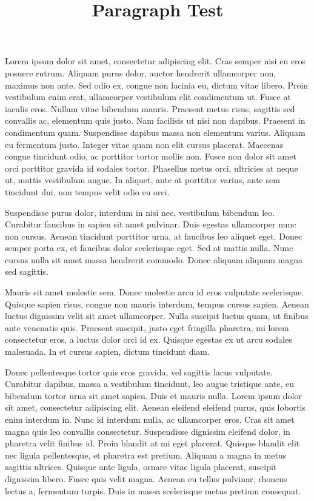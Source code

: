 \documentclass{article}
\title{Paragraph Test}
\begin{document}
Lorem ipsum dolor sit amet, consectetur adipiscing elit. Cras semper nisi eu eros posuere rutrum. Aliquam purus dolor, auctor hendrerit ullamcorper non, maximus non ante. Sed odio ex, congue non lacinia eu, dictum vitae libero. Proin vestibulum enim erat, ullamcorper vestibulum elit condimentum ut. Fusce at iaculis eros. Nullam vitae bibendum mauris. Praesent metus risus, sagittis sed convallis ac, elementum quis justo. Nam facilisis ut nisi non dapibus. Praesent in condimentum quam. Suspendisse dapibus massa non elementum varius. Aliquam eu fermentum justo. Integer vitae quam non elit cursus placerat. Maecenas congue tincidunt odio, ac porttitor tortor mollis non. Fusce non dolor sit amet orci porttitor gravida id sodales tortor. Phasellus metus orci, ultricies at neque ut, mattis vestibulum augue. In aliquet, ante at porttitor varius, ante sem tincidunt dui, non tempus velit odio eu orci.

Suspendisse purus dolor, interdum in nisi nec, vestibulum bibendum leo. Curabitur faucibus in sapien sit amet pulvinar. Duis egestas ullamcorper nunc non cursus. Aenean tincidunt porttitor urna, at faucibus leo aliquet eget. Donec semper porta ex, et faucibus dolor scelerisque eget. Sed at mattis nulla. Nunc cursus nulla sit amet massa hendrerit commodo. Donec aliquam aliquam magna sed sagittis.

Mauris sit amet molestie sem. Donec molestie arcu id eros vulputate scelerisque. Quisque sapien risus, congue non mauris interdum, tempus cursus sapien. Aenean luctus dignissim velit sit amet ullamcorper. Nulla suscipit luctus quam, ut finibus ante venenatis quis. Praesent suscipit, justo eget fringilla pharetra, mi lorem consectetur eros, a luctus dolor orci id ex. Quisque egestas ex ut arcu sodales malesuada. In et cursus sapien, dictum tincidunt diam.

Donec pellentesque tortor quis eros gravida, vel sagittis lacus vulputate. Curabitur dapibus, massa a vestibulum tincidunt, leo augue tristique ante, eu bibendum tortor urna sit amet sapien. Duis et mauris nulla. Lorem ipsum dolor sit amet, consectetur adipiscing elit. Aenean eleifend eleifend purus, quis lobortis enim interdum in. Nunc id interdum nulla, ac ullamcorper eros. Cras sit amet magna quis leo convallis consectetur. Suspendisse dignissim eleifend dolor, in pharetra velit finibus id. Proin blandit at mi eget placerat. Quisque blandit elit nec ligula pellentesque, et pharetra est pretium. Aliquam a magna in metus sagittis ultrices. Quisque ante ligula, ornare vitae ligula placerat, suscipit dignissim libero. Fusce quis velit magna. Aenean eu tellus pulvinar, rhoncus lectus a, fermentum turpis. Duis in massa scelerisque metus pretium consequat. 
\end{document}
